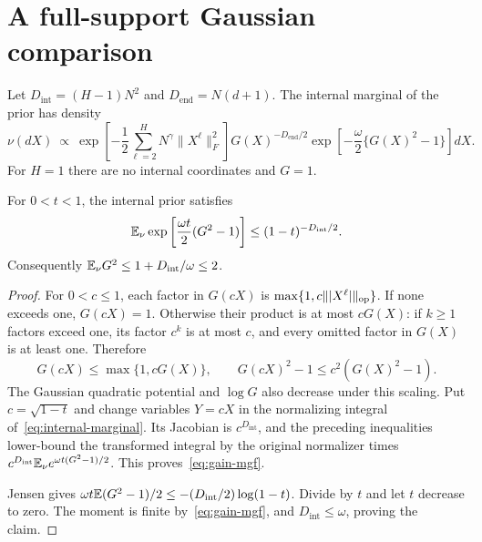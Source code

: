 \section{A full-support Gaussian comparison}
Let $D_{\mathrm{int}}=(H-1)N^2$ and $D_{\mathrm{end}}=N(d+1)$. The internal marginal of the prior has density
\begin{equation}
 \nu(dX)\ \propto\
 \exp\left[-\frac12\sum_{\ell=2}^HN^\gamma\|X^\ell\|_F^2\right]
 G(X)^{-D_{\mathrm{end}}/2}
 \exp\left[-\frac\omega2\{G(X)^2-1\}\right]dX.
 \label{eq:internal-marginal}
\end{equation}
For $H=1$ there are no internal coordinates and $G=1$.

\begin{lemma}
\label{lem:gain-moment}
For $0<t<1$, the internal prior satisfies
\begin{equation}
 \mathbb E_\nu\exp\left[\frac{\omega t}{2}(G^2-1)\right]
 \le(1-t)^{-D_{\mathrm{int}}/2}.
 \label{eq:gain-mgf}
\end{equation}
Consequently $\mathbb E_\nu G^2\le1+D_{\mathrm{int}}/\omega\le2$.
\end{lemma}
\begin{proof}
For $0<c\le1$, each factor in $G(cX)$ is $\max\{1,c\||X^\ell|\|_{\mathrm{op}}\}$. If none exceeds one, $G(cX)=1$. Otherwise their product is at most $cG(X)$: if $k\ge1$ factors exceed one, its factor $c^k$ is at most $c$, and every omitted factor in $G(X)$ is at least one. Therefore
\[
 G(cX)\le\max\{1,cG(X)\},\qquad
 G(cX)^2-1\le c^2(G(X)^2-1).
\]
The Gaussian quadratic potential and $\log G$ also decrease under this scaling. Put $c=\sqrt{1-t}$ and change variables $Y=cX$ in the normalizing integral of~\eqref{eq:internal-marginal}. Its Jacobian is $c^{D_{\mathrm{int}}}$, and the preceding inequalities lower-bound the transformed integral by the original normalizer times
$c^{D_{\mathrm{int}}}\mathbb E_\nu e^{\omega t(G^2-1)/2}$. This proves~\eqref{eq:gain-mgf}.

Jensen gives
$\omega t\mathbb E(G^2-1)/2\le-(D_{\mathrm{int}}/2)\log(1-t)$.
Divide by $t$ and let $t$ decrease to zero. The moment is finite by~\eqref{eq:gain-mgf}, and $D_{\mathrm{int}}\le\omega$, proving the claim.
\end{proof}


